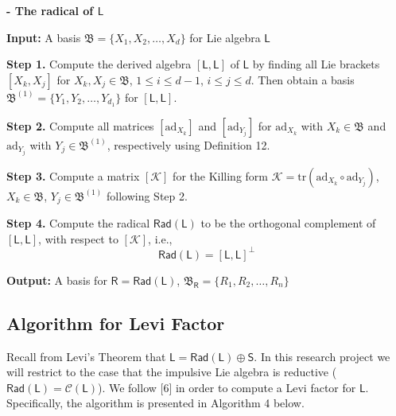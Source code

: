 \documentclass[11pt,a4paper]{article}
\begin{document}
\begin{algorithm}
\caption{\textbf{- The radical of $\mathsf{L}$}}
\begin{algorithmic}

\State \textbf{Input:} A basis $\mathfrak{B} = \{X_1, X_2, \dots, X_d \}$ for Lie algebra $\mathsf{L}$ 

\State \quad \textbf{Step 1.} Compute the derived algebra $[\mathsf{L},\mathsf{L}]$ of $\mathsf{L}$ by finding all Lie brackets $[X_k, X_j]$ for $X_k, X_j \in \mathfrak{B}$, $1 \leq i \leq d-1$, $i \leq j \leq d$. Then obtain a basis $\mathfrak{B}^{(1)}=\{Y_1, Y_2, \dots, Y_{d_1} \}$ for $[\mathsf{L},\mathsf{L}]$.

\State \quad \textbf{Step 2.} Compute all matrices $[\mathrm{ad}_{X_k}]$ and $[\mathrm{ad}_{Y_j}]$ for $\mathrm{ad}_{X_k}$ with $X_k \in \mathfrak{B}$ and $\mathrm{ad}_{Y_j}$ with $Y_j \in \mathfrak{B}^{(1)}$, respectively using Definition 12.

\State \quad \textbf{Step 3.} Compute a matrix $[\mathcal{K}]$ for the Killing form $\mathcal{K} = \mathrm{tr}(\mathrm{ad}_{X_k} \circ \mathrm{ad}_{Y_j})$, $X_k \in \mathfrak{B}$, $Y_j \in \mathfrak{B}^{(1)}$ following Step 2.

\State \quad \textbf{Step 4.} Compute the radical
$\mathsf{Rad}(\mathsf{L})$ to be the orthogonal complement of $[\mathsf{L},\mathsf{L}]$, with respect to $[\mathcal{K}]$, i.e., $$\mathsf{Rad}(\mathsf{L}) = {[\mathsf{L},\mathsf{L}]}^{\perp}$$

\State \textbf{Output:} A basis for $\mathsf{R} = \mathsf{Rad}(\mathsf{L})$, $\mathfrak{B}_{\mathsf{R}} = \{R_1, R_2, \dots, R_n \}$
\end{algorithmic}
\end{algorithm}
%
%

\subsection{Algorithm for Levi Factor}
\qquad Recall from Levi's Theorem that 
$\mathsf{L} = \mathsf{Rad}(\mathsf{L}) \oplus \mathsf{S}$.
In this research project we will restrict to the case that the impulsive Lie algebra is reductive ($\mathsf{Rad}(\mathsf{L}) = \mathcal{C}(\mathsf{L})$). We follow [6] in order to compute a Levi factor for $\mathsf{L}$. Specifically, the algorithm is presented in Algorithm 4 below.\\
\end{document}
